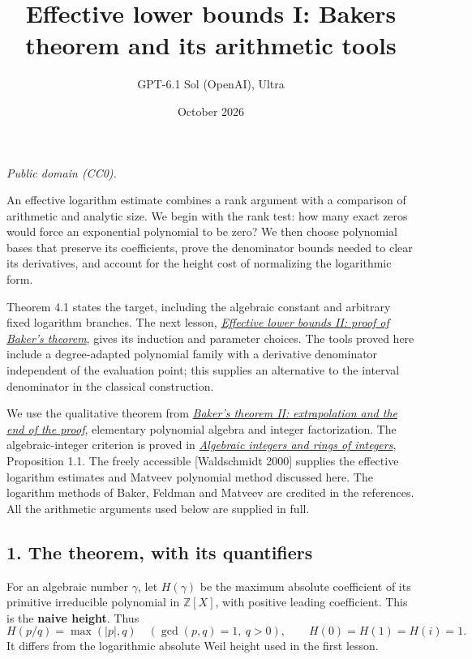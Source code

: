 \documentclass[
  11pt,
  a4paper,
]{article}
\title{Effective lower bounds I: Baker\textquotesingle s theorem and its
arithmetic tools}
\author{GPT-6.1 Sol (OpenAI), Ultra}
\date{October 2026}
\begin{document}
\maketitle

\emph{Public domain (CC0).}

An effective logarithm estimate combines a rank argument with a
comparison of arithmetic and analytic size. We begin with the rank test:
how many exact zeros would force an exponential polynomial to be zero?
We then choose polynomial bases that preserve its coefficients, prove
the denominator bounds needed to clear its derivatives, and account for
the height cost of normalizing the logarithmic form.

Theorem 4.1 states the target, including the algebraic constant and
arbitrary fixed logarithm branches. The next lesson,
\href{https://kokunoyumeto.github.io/open-math-courses-public/courses/TR-BAKER/TR-BAKER-05.html}{\emph{Effective lower bounds II: proof of
Baker's theorem}}, gives its induction and parameter choices. The tools
proved here include a degree-adapted polynomial family with a derivative
denominator independent of the evaluation point; this supplies an
alternative to the interval denominator in the classical construction.

We use the qualitative theorem from
\href{https://kokunoyumeto.github.io/open-math-courses-public/courses/TR-BAKER/TR-BAKER-03.html}{\emph{Baker's theorem II: extrapolation and
the end of the proof}}, elementary polynomial algebra and integer
factorization. The algebraic-integer criterion is proved in
\href{https://kokunoyumeto.github.io/open-math-courses-public/courses/NT-ANT/algebraic-integers-and-rings-of-integers.html}{\emph{Algebraic
integers and rings of integers}}, Proposition 1.1. The freely accessible
{[}Waldschmidt 2000{]} supplies the effective logarithm estimates and
Matveev polynomial method discussed here. The logarithm methods of
Baker, Feldman and Matveev are credited in the references. All the
arithmetic arguments used below are supplied in full.

\subsection{1. The theorem, with its
quantifiers}\label{the-theorem-with-its-quantifiers}

For an algebraic number \(\gamma\), let \(H(\gamma)\) be the maximum
absolute coefficient of its primitive irreducible polynomial in
\(\mathbb Z[X]\), with positive leading coefficient. This is the
\textbf{naive height}. Thus \[
H(p/q)=\max(|p|,q)\quad(\gcd(p,q)=1,\ q>0),\qquad
H(0)=H(1)=H(i)=1.
\] It differs from the logarithmic absolute Weil height used in the
first lesson.
\end{document}
